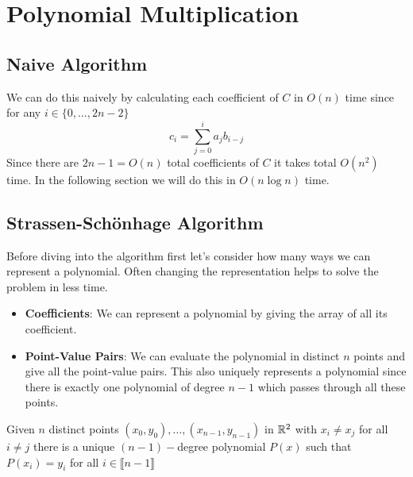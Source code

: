 \chapter{Polynomial Multiplication}
\begin{algoprob}
\end{algoprob}
\section{Naive Algorithm}
We can do this naively by calculating each coefficient of $C$ in $O(n)$ time since for any $i\in\{0,\dots, 2n-2\}$ $$c_i=\sum_{j=0}^ia_jb_{i-j}$$Since there are $2n-1=O(n)$ total coefficients of $C$ it takes total $O(n^2)$ time. In the following section we will do this in $O(n\log n)$ time.
\section{Strassen-Sch\"{o}nhage Algorithm}
Before diving into the algorithm first let's consider how many ways we can represent a polynomial. Often changing the representation helps to solve the problem in less time.\begin{itemize}
	\item \textbf{Coefficients}: We can represent a polynomial by giving the array of all its coefficient.
	\item \textbf{Point-Value Pairs}: We can evaluate the polynomial in distinct $n$ points and give all the point-value pairs. This also uniquely represents a polynomial since there is exactly one polynomial of degree $n-1$ which passes through all these points.
\end{itemize}
\begin{Theorem}{}{}
	Given $n$ distinct points $(x_0,y_0),\dots, (x_{n-1},y_{n-1})$ in $\mathbb{R}^2$ with $x_i\neq x_j$ for all $i\neq j$ there is a unique $(n-1)-$degree polynomial $P(x)$ such that $P(x_i)=y_i$ for all $i\in \llbracket n-1\rrbracket$
\end{Theorem}
\parinn

